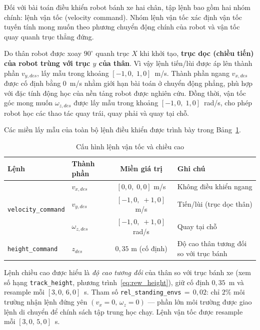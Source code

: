 Đối với bài toán điều khiển robot bánh xe hai chân, tập lệnh bao gồm hai nhóm chính: lệnh vận tốc (velocity command). Nhóm lệnh vận tốc xác định vận tốc tuyến tính mong muốn theo phương chuyển động chính của robot và vận tốc quay quanh trục thẳng đứng. 

Do thân robot được xoay $90^\circ$ quanh trục $X$ khi khởi tạo, \textbf{trục
dọc (chiều tiến) của robot trùng với trục $y$ của thân}. Vì vậy lệnh tiến/lùi
được áp lên thành phần $v_{y,des}$, lấy mẫu trong khoảng $[-1{,}0,\;1{,}0]$~m/s.
Thành phần ngang $v_{x,des}$ được cố định bằng 0~m/s nhằm giới hạn bài toán ở
chuyển động phẳng, phù hợp với đặc tính động học của nền tảng robot được nghiên
cứu. Đồng thời, vận tốc góc mong muốn $\omega_{z,des}$ được lấy mẫu trong
khoảng $[-1{,}0,\;1{,}0]$~rad/s, cho phép robot học các thao tác quay trái,
quay phải và quay tại chỗ.

Các miền lấy mẫu của toàn bộ lệnh điều khiển được trình bày trong Bảng~\ref{tab:commands}.

\begin{table}[H]
    \centering
    \caption{Cấu hình lệnh vận tốc và chiều cao}
    \label{tab:commands}
    \renewcommand{\arraystretch}{1.3}
    \begin{tabular}{|l|l|c|l|}
    \hline
    \textbf{Lệnh} & \textbf{Thành phần} & \textbf{Miền giá trị} & \textbf{Ghi chú} \\
    \hline
    \multirow{3}{*}{\texttt{velocity\_command}} &
        $v_{x,des}$ & $[0{,}0,\;0{,}0]$ m/s  & Không điều khiển ngang \\
    & $v_{y,des}$ & $[-1{,}0,\;+1{,}0]$ m/s & Tiến/lùi (trục dọc thân) \\
    & $\omega_{z,des}$ & $[-1{,}0,\;+1{,}0]$ rad/s & Quay tại chỗ \\
    \hline
    \texttt{height\_command} & $z_{des}$ & $0{,}35$ m (cố định) & Độ cao thân tương đối so với trục bánh \\
    \hline
    \end{tabular}
\end{table}

Lệnh chiều cao được hiểu là \emph{độ cao tương đối} của thân so với trục
bánh xe (xem số hạng \texttt{track\_height},
phương trình~\eqref{eq:rew_height}), giữ cố định $0{,}35$~m và resample mỗi
$[3{,}0,\,6{,}0]$~s. Tham số \texttt{rel\_standing\_envs}$\,{=}\,0{,}02$:
chỉ $2\%$ môi trường nhận lệnh đứng yên $(v_x{=}0,\,\omega_z{=}0)$ — phần
lớn môi trường được giao lệnh di chuyển để chính sách tập trung học chạy.
Lệnh vận tốc được resample mỗi $[3{,}0,\,5{,}0]$~s.

